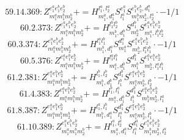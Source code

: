 \documentclass[letterpaper,10pt,fleqn,leqno,onecolumn]{article}
\begin{document}
\begin{equation} \;\;\;\;\;\;  59.14.369: Z^{e_{1}^{a}e_{1}^{b}e_{2}^{b}}_{m_{1}^{a}m_{1}^{b}m_{2}^{b}}+=H^{l_{1}^{a},l_{2}^{a}}_{m_{1}^{a},d_{1}^{a}}S^{e_{1}^{a}}_{l_{1}^{a}}S^{e_{1}^{b}e_{2}^{b},d_{1}^{a}}_{m_{1}^{b}m_{2}^{b},l_{2}^{a}}\cdot -1/1 \end{equation}
\begin{equation} \;\;\;\;\;\;  60.2.373: Z^{e_{1}^{a}e_{1}^{b}e_{2}^{b}}_{m_{1}^{a}m_{1}^{b}m_{2}^{b}}+=H^{l_{1}^{b}l_{2}^{b}}_{m_{1}^{b},d_{1}^{b}}S^{d_{1}^{b}}_{m_{2}^{b}}S^{e_{1}^{a}e_{1}^{b}e_{2}^{b}}_{m_{1}^{a},l_{1}^{b}l_{2}^{b}} \end{equation}
\begin{equation} \;\;\;\;\;\;  60.3.374: Z^{e_{1}^{a}e_{1}^{b}e_{2}^{b}}_{m_{1}^{a}m_{1}^{b}m_{2}^{b}}+=H^{l_{1}^{a}l_{1}^{b}}_{m_{1}^{b},d_{1}^{a}}S^{d_{1}^{a}}_{m_{1}^{a}}S^{e_{1}^{a}e_{1}^{b}e_{2}^{b}}_{m_{2}^{b},l_{1}^{a}l_{1}^{b}}\cdot -1/1 \end{equation}
\begin{equation} \;\;\;\;\;\;  60.5.376: Z^{e_{1}^{a}e_{1}^{b}e_{2}^{b}}_{m_{1}^{a}m_{1}^{b}m_{2}^{b}}+=H^{l_{1}^{a}l_{1}^{b}}_{m_{1}^{a},d_{1}^{b}}S^{d_{1}^{b}}_{m_{1}^{b}}S^{e_{1}^{a}e_{1}^{b}e_{2}^{b}}_{m_{2}^{b},l_{1}^{a}l_{1}^{b}} \end{equation}
\begin{equation} \;\;\;\;\;\;  61.2.381: Z^{e_{1}^{a}e_{1}^{b}e_{2}^{b}}_{m_{1}^{a}m_{1}^{b}m_{2}^{b}}+=H^{l_{1}^{b},l_{2}^{b}}_{m_{1}^{b},d_{1}^{b}}S^{d_{1}^{b}}_{l_{1}^{b}}S^{e_{1}^{a}e_{1}^{b}e_{2}^{b}}_{m_{1}^{a}m_{2}^{b},l_{2}^{b}}\cdot -1/1 \end{equation}
\begin{equation} \;\;\;\;\;\;  61.4.383: Z^{e_{1}^{a}e_{1}^{b}e_{2}^{b}}_{m_{1}^{a}m_{1}^{b}m_{2}^{b}}+=H^{l_{1}^{b},l_{1}^{a}}_{m_{1}^{a},d_{1}^{b}}S^{d_{1}^{b}}_{l_{1}^{b}}S^{e_{1}^{a}e_{1}^{b}e_{2}^{b}}_{m_{1}^{b}m_{2}^{b},l_{1}^{a}} \end{equation}
\begin{equation} \;\;\;\;\;\;  61.8.387: Z^{e_{1}^{a}e_{1}^{b}e_{2}^{b}}_{m_{1}^{a}m_{1}^{b}m_{2}^{b}}+=H^{l_{1}^{a},l_{1}^{b}}_{m_{1}^{b},d_{1}^{a}}S^{d_{1}^{a}}_{l_{1}^{a}}S^{e_{1}^{a}e_{1}^{b}e_{2}^{b}}_{m_{1}^{a}m_{2}^{b},l_{1}^{b}}\cdot -1/1 \end{equation}
\begin{equation} \;\;\;\;\;\;  61.10.389: Z^{e_{1}^{a}e_{1}^{b}e_{2}^{b}}_{m_{1}^{a}m_{1}^{b}m_{2}^{b}}+=H^{l_{1}^{a},l_{2}^{a}}_{m_{1}^{a},d_{1}^{a}}S^{d_{1}^{a}}_{l_{1}^{a}}S^{e_{1}^{a}e_{1}^{b}e_{2}^{b}}_{m_{1}^{b}m_{2}^{b},l_{2}^{a}} \end{equation}
\end{document}
